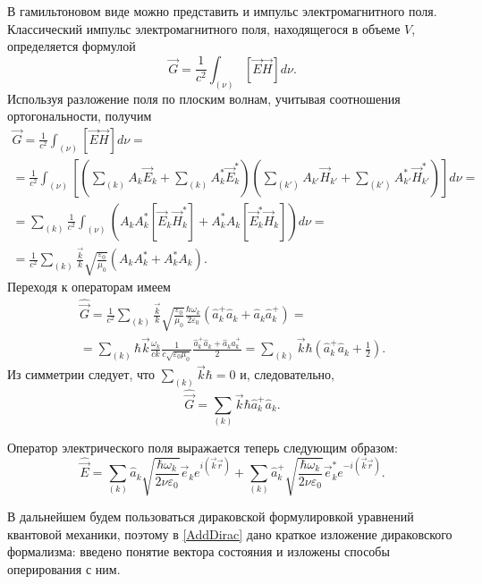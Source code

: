 В гамильтоновом виде можно представить и импульс электромагнитного 
поля. Классический импульс электромагнитного поля, находящегося в
объеме  $V$,  определяется формулой 
\begin{equation}
\vec{G} = \frac{1}{c^2} \int_{(\nu)}
\left[\vec{E} \vec{H} \right] d \nu.
\label{eqCh1_task3_1}
\end{equation}
Используя разложение поля по плоским волнам, учитывая соотношения
ортогональности, получим
\begin{eqnarray}
  \vec{G} = \frac{1}{c^2} \int_{(\nu)}
  \left[\vec{E} \vec{H} \right] d \nu =
  \nonumber \\
  =
  \frac{1}{c^2} \int_{(\nu)}
  \left[
    \left(\sum_{(k)} A_k \vec{E}_k +
    \sum_{(k)} A_k^\ast \vec{E}_k^\ast \right)
    \left(\sum_{(k')} A_{k'} \vec{H}_{k'} +
    \sum_{(k')} A_{k'}^\ast \vec{H}_{k'}^\ast \right)\right]
  d \nu =
  \nonumber \\
  =
  \sum_{(k)}
  \frac{1}{c^2} \int_{(\nu)}
  \left(
  A_k A_k^\ast \left[\vec{E}_k \vec{H}_k^\ast \right]
  +
  A_k^\ast A_k \left[\vec{E}_k^\ast \vec{H}_k \right]
  \right)
  d \nu =
  \nonumber \\
  =
  \frac{1}{c^2} \sum_{(k)} \frac{\vec{k}}{k}
  \sqrt{\frac{\varepsilon_0}{\mu_0}}
  \left(
  A_k A_k^\ast + A_k^\ast A_k
  \right).
  \nonumber
\end{eqnarray}
Переходя к операторам имеем
\begin{eqnarray}
  \hat{\vec{G}} =
  \frac{1}{c^2} \sum_{(k)} \frac{\vec{k}}{k}
  \sqrt{\frac{\varepsilon_0}{\mu_0}}
  \frac{\hbar \omega_k}{2 \varepsilon_0}
  \left(\hat{a}_k^{+} \hat{a}_k + \hat{a}_k \hat{a}_k^{+}\right)
  =
  \nonumber \\
  =
  \sum_{(k)}
  \hbar
  \vec{k}
  \frac{\omega_k}{c k}
  \frac{1}{c \sqrt{\varepsilon_0 \mu_0}}
  \frac{\hat{a}_k^{+} \hat{a}_k + \hat{a}_k \hat{a}_k^{+}}{2}
  =
  \sum_{(k)} \vec{k} \hbar\left( \hat{a}_k^{+} \hat{a}_k +
\frac{1}{2} \right).
\nonumber
\end{eqnarray}
Из симметрии  следует, что $\sum_{(k)} \vec{k} \hbar = 0$ и, следовательно, 
\begin{equation}
\hat{\vec{G}} = \sum_{(k)} \vec{k} \hbar\hat{a}_k^{+} \hat{a}_k.
\label{eqCh1_task3_2}
\end{equation}

Оператор электрического поля выражается теперь следующим образом:
\begin{equation}
\hat{\vec{E}} = \sum_{(k)} \hat{a}_k\sqrt{\frac{\hbar \omega_k}{2 \nu
    \varepsilon_0}} \vec{e}_k e^{i\left(\vec{k}\vec{r}\right)} +
\sum_{(k)} \hat{a}_k^{+}\sqrt{\frac{\hbar \omega_k}{2 \nu
    \varepsilon_0}} \vec{e}_k^{*} e^{-i\left(\vec{k}\vec{r}\right)}.
\end{equation}

В дальнейшем будем пользоваться дираковской формулировкой уравнений
квантовой механики, поэтому в \autoref{AddDirac} дано краткое
изложение дираковского формализма: введено понятие вектора состояния и
изложены способы оперирования с ним.  
